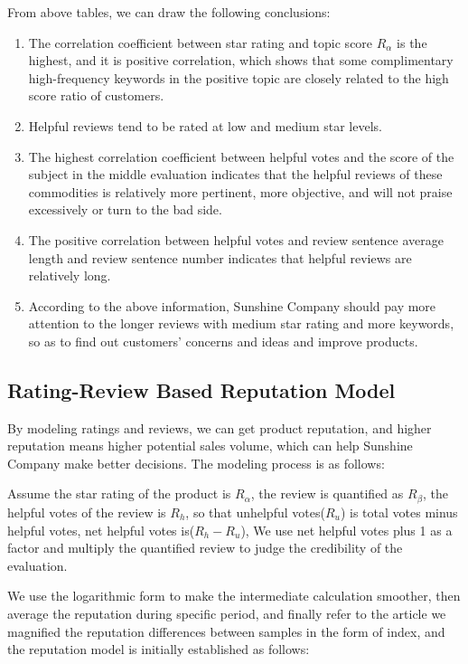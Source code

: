 \documentclass{mcmthesis}
\begin{document}
 From above tables, we can draw the following conclusions:
\begin{enumerate}
	\item The correlation coefficient between star rating and topic score $R_{\alpha}$ is the highest, and it is positive correlation, which shows that some complimentary high-frequency keywords in the positive topic are closely related to the high score ratio of customers. 
	\item Helpful reviews tend to be rated at low and medium star levels.
	\item The highest correlation coefficient between helpful votes and the score of the subject in the middle evaluation indicates that the helpful reviews of these commodities is relatively more pertinent, more objective, and will not praise excessively or turn to the bad side.
	\item The positive correlation between helpful votes and review sentence average length and review sentence number indicates that helpful reviews are relatively long.
	\item According to the above information, Sunshine Company should pay more attention to the longer reviews with medium star rating and more keywords, so as to find out customers' concerns and ideas and improve products.
\end{enumerate}
\subsection{Rating-Review Based Reputation Model}
\label{task_b}
By modeling ratings and reviews, we can get product reputation, and higher reputation means higher potential sales volume, which can help Sunshine Company make better decisions. The modeling process is as follows:

Assume the star rating of the product is $R_{\alpha}$, the review is quantified as $R_{\beta}$, the helpful votes of the review is $R_{h}$, so that unhelpful votes($R_{u}$) is total votes minus helpful votes, net helpful votes is($R_{h}-R_{u}$), We use net helpful votes plus 1 as a factor and multiply the quantified review to judge the credibility of the evaluation.

We use the logarithmic form to make the intermediate calculation smoother, then average the reputation during specific period, and finally refer to the article\cite{subkhankulova2006comparative} we magnified the reputation differences between samples in the form of index, and the reputation model is initially established as follows:
\end{document}
